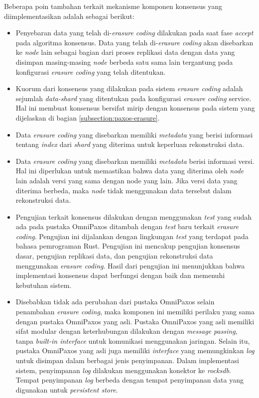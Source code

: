 Beberapa poin tambahan terkait mekanisme komponen konsensus yang diimplementasikan adalah sebagai berikut:
\begin{itemize}
  \item Penyebaran data yang telah di-\textit{erasure coding} dilakukan pada saat fase \textit{accept} pada algoritma konsensus. Data yang telah di-\textit{erasure coding} akan disebarkan ke \textit{node} lain sebagai bagian dari proses replikasi data dengan data yang disimpan masing-masing \textit{node} berbeda satu sama lain tergantung pada konfigurasi \textit{erasure coding} yang telah ditentukan.
  \item Kuorum dari konsensus yang dilakukan pada sistem \textit{erasure coding} adalah sejumlah \textit{data-shard} yang ditentukan pada konfigurasi \textit{erasure coding} service. Hal ini membuat konsensus bersifat mirip dengan konsensus pada sistem yang dijelaskan di bagian \ref{subsection:paxos-erasure}.
  \item Data \textit{erasure coding} yang disebarkan memiliki \textit{metadata} yang berisi informasi tentang \textit{index} dari \textit{shard} yang diterima untuk keperluan rekonstruksi data.
  \item Data \textit{erasure coding} yang disebarkan memiliki \textit{metadata} berisi informasi versi. Hal ini diperlukan untuk memastikan bahwa data yang diterima oleh \textit{node} lain adalah versi yang sama dengan node yang lain. Jika versi data yang diterima berbeda, maka \textit{node} tidak menggunakan data tersebut dalam rekonstruksi data.
  \item Pengujian terkait konsensus dilakukan dengan menggunakan \textit{test} yang sudah ada pada pustaka OmniPaxos ditambah dengan \textit{test} baru terkait \textit{erasure coding}. Pengujian ini dijalankan dengan lingkungan \textit{test} yang terdapat pada bahasa pemrograman Rust. Pengujian ini mencakup pengujian konsensus dasar, pengujian replikasi data, dan pengujian rekonstruksi data menggunakan \textit{erasure coding}. Hasil dari pengujian ini menunjukkan bahwa implementasi konsensus dapat berfungsi dengan baik dan memenuhi kebutuhan sistem.
  \item Disebabkan tidak ada perubahan dari pustaka OmniPaxos selain penambahan \textit{erasure coding}, maka komponen ini memiliki perilaku yang sama dengan pustaka OmniPaxos yang asli. Pustaka OmniPaxos yang asli memiliki sifat modular dengan keterhubungan dilakukan dengan \textit{message passing}, tanpa \textit{built-in interface} untuk komunikasi menggunakan jaringan. Selain itu, pustaka OmniPaxos yang asli juga memiliki \textit{interface} yang memungkinkan \textit{log} untuk disimpan dalam berbagai jenis penyimpanan. Dalam implementasi sistem, penyimpanan \textit{log} dilakukan menggunakan konektor ke \textit{rocksdb}. Tempat penyimpanan \textit{log} berbeda dengan tempat penyimpanan data yang digunakan untuk \textit{persistent store}.
\end{itemize}


